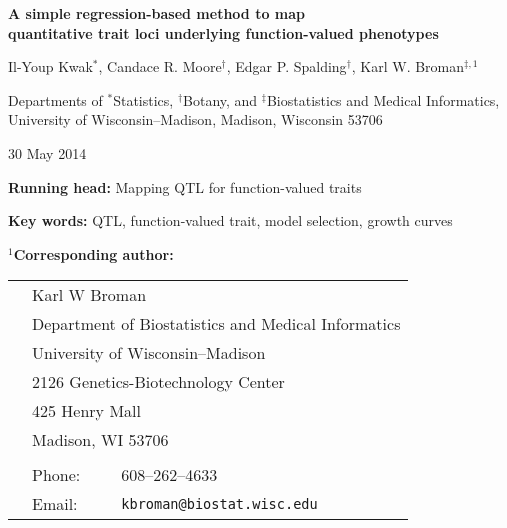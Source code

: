 \documentclass[12pt,letterpaper]{article}
\begin{document}

\vspace*{8mm}
\begin{center}

\textbf{\Large A simple regression-based method to map \\
  quantitative trait loci underlying function-valued
  phenotypes}

\bigskip \bigskip \bigskip \bigskip

{\large Il-Youp Kwak$^*$, Candace R. Moore$^\dagger$, Edgar
  P. Spalding$^\dagger$, Karl W. Broman$^{\ddagger,1}$}

\bigskip \bigskip

Departments of $^*$Statistics, $^\dagger$Botany, and $^\ddagger$Biostatistics and Medical
Informatics, \\
University of Wisconsin--Madison, Madison, Wisconsin 53706
\end{center}


\vfill

\hfill
{\footnotesize 30 May 2014}

\newpage

\noindent \textbf{Running head:} Mapping QTL for function-valued traits


\bigskip \bigskip \bigskip

\noindent \textbf{Key words:} QTL, function-valued trait, model
selection, growth curves



\bigskip \bigskip \bigskip

\noindent \textbf{$^1$Corresponding author:}

\begin{tabular}{lll}
 \\
 \hspace{1cm} & \multicolumn{2}{l}{Karl W Broman} \\
 & \multicolumn{2}{l}{Department of Biostatistics and Medical Informatics} \\
 & \multicolumn{2}{l}{University of Wisconsin--Madison} \\
 & \multicolumn{2}{l}{2126 Genetics-Biotechnology Center} \\
 & \multicolumn{2}{l}{425 Henry Mall} \\
 & \multicolumn{2}{l}{Madison, WI 53706} \\
 \\
 & Phone: & 608--262--4633 \\
 & Email: & \verb|kbroman@biostat.wisc.edu|
\end{tabular}
\end{document}
